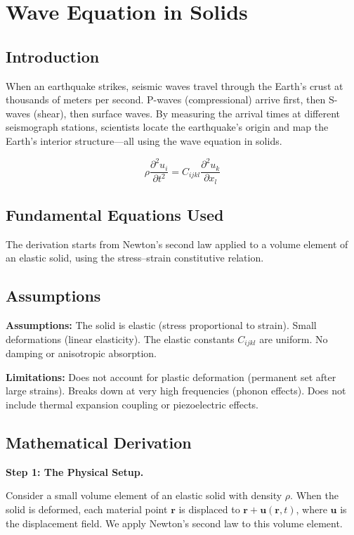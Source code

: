 \chapter{Wave Equation in Solids}

\section*{Introduction}

When an earthquake strikes, seismic waves travel through the Earth's crust at thousands of meters per second. P-waves (compressional) arrive first, then S-waves (shear), then surface waves. By measuring the arrival times at different seismograph stations, scientists locate the earthquake's origin and map the Earth's interior structure---all using the wave equation in solids.



\[
\rho \frac{\partial^2 u_i}{\partial t^2} = C_{ijkl} \frac{\partial^2 u_k}{\partial x_l}
\]

\section*{Fundamental Equations Used}

The derivation starts from Newton's second law applied to a volume element of an elastic solid, using the stress--strain constitutive relation.

\section*{Assumptions}

\textbf{Assumptions:} The solid is elastic (stress proportional to strain). Small deformations (linear elasticity). The elastic constants $C_{ijkl}$ are uniform. No damping or anisotropic absorption.


\textbf{Limitations:} Does not account for plastic deformation (permanent set after large strains). Breaks down at very high frequencies (phonon effects). Does not include thermal expansion coupling or piezoelectric effects.


\section*{Mathematical Derivation}

\textbf{Step 1: The Physical Setup.}

Consider a small volume element of an elastic solid with density $\rho$. When the solid is deformed, each material point $\mathbf{r}$ is displaced to $\mathbf{r} + \mathbf{u}(\mathbf{r}, t)$, where $\mathbf{u}$ is the displacement field. We apply Newton's second law to this volume element.

